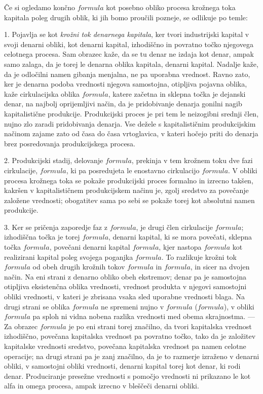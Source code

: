 \documentclass[a5paper]{scrbook}
\begin{document}
Če si ogledamo končno \( formula \) kot posebno obliko procesa krožnega toka kapitala poleg drugih oblik, ki jih bomo proučili pozneje, se odlikuje po temle:

1. Pojavlja se kot \emph{krožni tok denarnega kapitala}, ker tvori industrijski kapital v svoji denarni obliki, kot denarni kapital, izhodiščno in povratno točko njegovega celotnega procesa. Sam obrazec kaže, da se tu denar ne izdaja kot denar, ampak samo zalaga, da je torej le denarna oblika kapitala, denarni kapital. Nadalje kaže, da je odločilni namen gibanja menjalna, ne pa uporabna vrednost. Ravno zato, ker je denarna podoba vrednosti njegova samostojna, otipljiva pojavna oblika, kaže cirkulacijska oblika \( formula \), katere začetna in sklepna točka je dejanski denar, na najbolj oprijemljivi način, da je pridobivanje denarja gonilni nagib kapitalistične produkcije. Produkcijski proces je pri tem le neizogibni srednji člen, nujno zlo zaradi pridobivanja denarja. Vse dežele s kapitalističnim produkcijskim načinom zajame zato od časa do časa vrtoglavica, v kateri hočejo priti do denarja brez posredovanja produkcijskega procesa.

2. Produkcijski stadij, delovanje \( formula \), prekinja v tem krožnem toku dve fazi cirkulacije, \( formula \), ki pa posredujeta le enostavno cirkulacijo \( formula \). V obliki procesa krožnega toka se pokaže produkcijski proces formalno in izrecno takšen, kakršen v kapitalističnem produkcijskem načinu je, zgolj sredstvo za povečanje založene vrednosti; obogatitev sama po sebi se pokaže torej kot absolutni namen produkcije.

3. Ker se pričenja zaporedje faz z \( formula \), je drugi člen cirkulacije \( formula \); izhodiščna točka je torej \( formula \), denarni kapital, ki se mora povečati, sklepna točka \( formula \), povečani denarni kapital \( formula \), kjer nastopa \( formula \) kot realizirani kapital poleg svojega poganjka \( formula \). To razlikuje krožni tok \( formula \) od obeh drugih krožnih tokov \( formula \) in \( formula \), in sicer na dvojen način. Na eni strani z denarno obliko obeh ekstremov; denar pa je samostojna otipljiva eksistenčna oblika vrednosti, vrednost produkta v njegovi samostojni obliki vrednosti, v kateri je zbrisana vsaka sled uporabne vrednosti blaga. Na drugi strani se oblika \( formula \) ne spremeni nujno v \( formula \) (\( formula \)), v obliki \( formula \) pa sploh ni vidna nobena razlika vrednosti med obema skrajnostma. --- Za obrazec \( formula \) je po eni strani torej značilno, da tvori kapitalska vrednost izhodiščno, povečana kapitalska vrednost pa povratno točko, tako da je založitev kapitalske vrednosti sredstvo, povečana kapitalska vrednost pa namen celotne operacije; na drugi strani pa je zanj značilno, da je to razmerje izraženo v denarni obliki, v samostojni obliki vrednosti, denarni kapital torej kot denar, ki rodi denar. Produciranje presežne vrednosti s pomočjo vrednosti ni prikazano le kot alfa in omega procesa, ampak izrecno v bleščeči denarni obliki.
\end{document}
